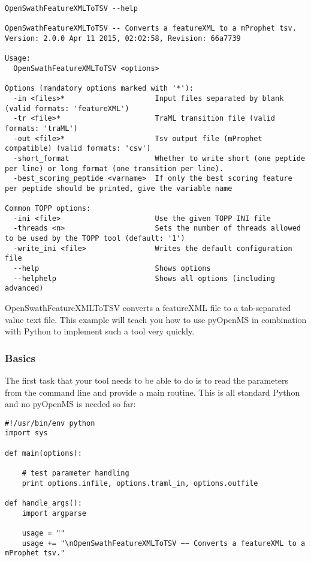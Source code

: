 {\begin{lstlisting}
OpenSwathFeatureXMLToTSV --help

OpenSwathFeatureXMLToTSV -- Converts a featureXML to a mProphet tsv.
Version: 2.0.0 Apr 11 2015, 02:02:58, Revision: 66a7739

Usage:
  OpenSwathFeatureXMLToTSV <options>

Options (mandatory options marked with '*'):
  -in <files>*                     Input files separated by blank (valid formats: 'featureXML')
  -tr <file>*                      TraML transition file (valid formats: 'traML')
  -out <file>*                     Tsv output file (mProphet compatible) (valid formats: 'csv')
  -short_format                    Whether to write short (one peptide per line) or long format (one transition per line).
  -best_scoring_peptide <varname>  If only the best scoring feature per peptide should be printed, give the variable name
                                   
Common TOPP options:
  -ini <file>                      Use the given TOPP INI file
  -threads <n>                     Sets the number of threads allowed to be used by the TOPP tool (default: '1')
  -write_ini <file>                Writes the default configuration file
  --help                           Shows options
  --helphelp                       Shows all options (including advanced)
\end{lstlisting}

OpenSwathFeatureXMLToTSV converts a featureXML file to a tab-separated value text file. This example will teach you how to use pyOpenMS in combination with Python to implement such a tool very quickly.

\subsubsection{Basics}
The first task that your tool needs to be able to do is to read the parameters from the command line and provide a main routine. This is all standard Python and no pyOpenMS is needed so far:

\begin{lstlisting}
#!/usr/bin/env python
import sys

def main(options):

    # test parameter handling
    print options.infile, options.traml_in, options.outfile

def handle_args():
    import argparse

    usage = ""
    usage += "\nOpenSwathFeatureXMLToTSV −− Converts a featureXML to a mProphet tsv."


\end{lstlisting}}

